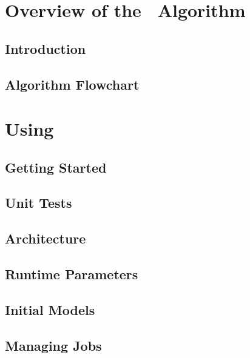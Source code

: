 \documentclass[11pt]{book}    %
\begin{document}
\mainmatter


\part{Overview of the \maestro\ Algorithm}

\chapter{Introduction}


\chapter{Algorithm Flowchart}
\label{ch:flowchart}


\part{Using \maestro}

\chapter{Getting Started}


\chapter{Unit Tests}


\chapter{Architecture}


\chapter{Runtime Parameters}
\label{ch:runtimeparameters}



\chapter{Initial Models}


\chapter{Managing Jobs}

\end{document}
